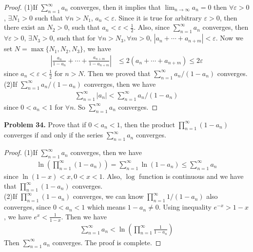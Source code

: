 \documentclass[12pt,leqno]{amsart}
\begin{document}
\begin{proof}
(1)If $\sum_{n=1}^\infty a_n$ converges, then it implies that $\lim_{n\to\infty} a_n= 0$ then $\forall \varepsilon > 0$, $\exists N_1 > 0$ such that $\forall n > N_1$, $a_n < \varepsilon$. Since it is true for arbitrary $\varepsilon > 0$, then there exist an $N_2 > 0$, such that $a_n < \varepsilon < \frac{1}{2}$. Also, since $\sum_{n=1}^\infty a_n$ converges, then $\forall \varepsilon > 0$, $\exists N_3 > 0$, such that for $\forall n > N_3, \forall m > 0$, $\left| a_n + \cdots + a_{n+m} \right| < \varepsilon$. Now we set $N = \max \{N_1, N_2, N_3 \}$, we have
\begin{align*}
    \left|\frac{a_n}{1 - a_n} + \cdots + \frac{a_{n+m}}{1 - a_{n+m}}\right| & \leq 2(a_n + \cdots + a_{n+m}) \leq 2 \varepsilon
\end{align*}
since $a_n < \varepsilon < \frac{1}{2}$ for $n > N$. Then we proved that $\sum_{n=1}^\infty a_n/(1-a_n)$ converges. \\
\hspace*{2em}(2)If $\sum_{n=1}^\infty a_n/(1-a_n)$ converges, then we have 
\begin{align*}
    \sum_{n=1}^\infty |a_n| < \sum_{n=1}^\infty a_n/(1-a_n)
\end{align*}
since $0 < a_n < 1$ for $\forall n$. So $\sum_{n=1}^\infty a_n$ converges.
\end{proof}

\medskip


\noindent
{\bf Problem 34.}
Prove that if $0<a_n<1$, then the product $\prod_{n=1}^\infty (1-a_n)$ converges
if and only if the series $\sum_{n=1}^\infty a_n$ converges.

\begin{proof}
(1)If $\sum_{n=1}^\infty a_n$ converges, then we have 
\begin{align*}
    \ln \left(\prod^\infty_{n=1} (1 - a_n) \right) = \sum^\infty_{n=1} \ln (1 - a_n) \leq \sum^\infty_{n=1} a_n 
\end{align*}
since $\ln (1 - x) < x, 0 < x < 1$. Also, $\log$ function is continuous and we have that $\prod^\infty_{n=1} (1 - a_n)$ converges. \\
\hspace*{2em}(2)If $\prod_{n=1}^\infty (1-a_n)$ converges, we can know $\prod_{n=1}^\infty 1/(1-a_n)$ also converges, since $0 < a_n < 1$ which means $1 - a_n \neq 0$. Using inequality $e^{-x} > 1- x$, we have $e^x < \frac{1}{1 - x}$. Then we have
\begin{align*}
    \sum^\infty_{n=1} a_n < \ln \left(\prod^\infty_{n=1} \frac{1}{1 - a_n} \right)
\end{align*}
Then $\sum^\infty_{n=1} a_n$ converges. The proof is complete.
\end{proof}
\end{document}
